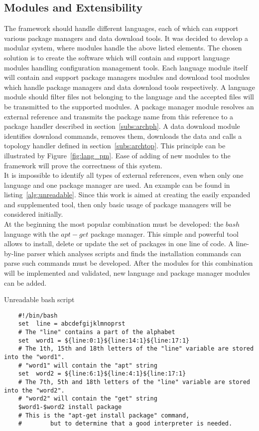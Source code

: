 \subsection{Modules and Extensibility}
The framework should handle different languages, each of which can support various package managers and data download tools.
It was decided to develop a modular system, where modules handle the above listed elements.
The chosen solution is to create the software which will contain and support language modules handling configuration management tools.
Each language module itself will contain and support package managers modules and download tool modules which handle package managers and data download tools respectively.
A language module should filter files not belonging to the language and the accepted files will be transmitted to the supported modules.
A package manager module resolves an external reference and transmits the package name from this reference to a package handler described in section~\ref{subs:archph}.
A data download module identifies download commands, removes them, downloads the data and calls a topology handler defined in section~\ref{subs:archtop}. 
This principle can be illustrated by Figure~\ref{fig:lang_pm}.
Ease of adding of new modules to the framework will prove the correctness of this system.\\
It is impossible to identify all types of external references, even when only one language and one package manager are used.
An example can be found in listing~\ref{alg:unreadable}.
Since this work is aimed at creating the easily expanded and supplemented tool, then only basic usage of package managers will be considered initially.\\
At the beginning the most popular combination must be developed: the $bash$ language with the $apt-get$ package manager.
This simple and powerful tool allows to install, delete or update the set of packages in one line of code.
A line-by-line parser which analyses scripts and finds the installation commands can parse such commands must be developed.
After the modules for this combination will be implemented and validated, new language and package manager modules can be added.
\begin{Listing} 
	\caption{Unreadable bash script}
	\label{alg:unreadable}
	\begin{lstlisting}
	#!/bin/bash
	set  line = abcdefgijklmnoprst
	# The "line" contains a part of the alphabet
	set  word1 = ${line:0:1}${line:14:1}${line:17:1} 
	# The 1th, 15th and 18th letters of the "line" variable are stored into the "word1".
	# "word1" will contain the "apt" string 
	set  word2 = ${line:6:1}${line:4:1}${line:17:1}
	# The 7th, 5th and 18th letters of the "line" variable are stored into the "word2".
	# "word2" will contain the "get" string 
	$word1-$word2 install package
	# This is the "apt-get install package" command,
	#		 but to determine that a good interpreter is needed.
	\end{lstlisting}
\end{Listing}

